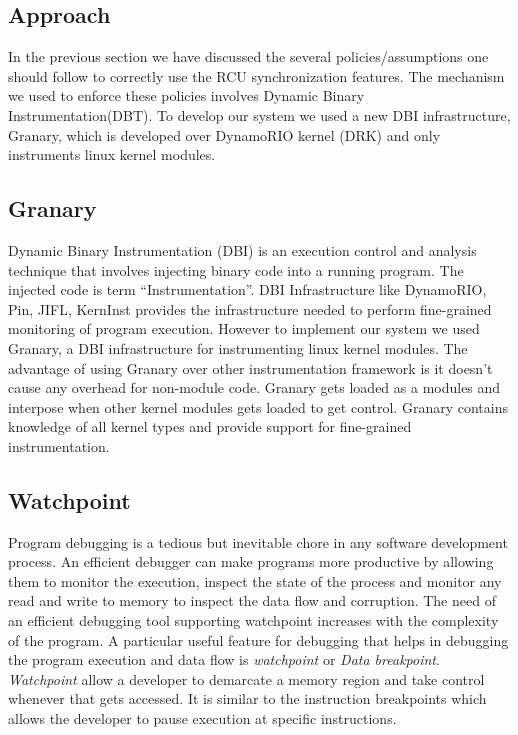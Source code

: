 \subsection{Approach}
In the previous section we have discussed the several policies/assumptions one should follow to correctly use the RCU synchronization features. The mechanism we used to enforce these policies involves Dynamic Binary Instrumentation(DBT). To develop our system we used a new DBI infrastructure, Granary, which is developed over DynamoRIO kernel (DRK) and only instruments linux kernel modules. 

\subsection{Granary}
Dynamic Binary Instrumentation (DBI) is an execution control and analysis technique that involves injecting binary code into a running program. The injected code is term “Instrumentation”. DBI Infrastructure like DynamoRIO, Pin, JIFL, KernInst provides the infrastructure needed to perform fine-grained monitoring of program execution. However to implement our system we used Granary, a DBI infrastructure for instrumenting linux kernel modules. The advantage of using Granary over other instrumentation framework is it doesn’t cause any overhead for non-module code. Granary gets loaded as a modules and interpose when other kernel modules gets loaded to get control. Granary contains knowledge of all kernel types and provide support for fine-grained instrumentation.

\subsection{Watchpoint}
Program debugging is a tedious but inevitable chore in any software development process. An efficient debugger can make programs more productive by allowing them to monitor the execution, inspect the state of the process and monitor any read and write to memory to inspect the data flow and corruption. The need of an efficient debugging tool supporting watchpoint increases with the complexity of the program. A particular useful feature for debugging that helps in debugging the program execution and data flow is \emph{watchpoint} or \emph{Data breakpoint}. \emph{Watchpoint} allow a developer to demarcate a memory region and take control whenever that gets accessed. It is similar to the instruction breakpoints which allows the developer to pause execution at specific instructions.

